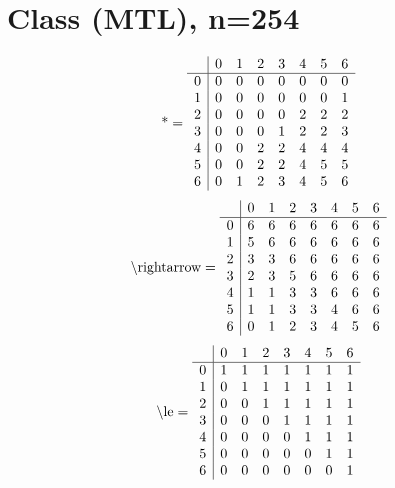 \documentclass[11pt]{article}
\begin{document}
\section{Class (MTL), n=254}
\[\text{*} = 
\begin{array}{r | r r r r r r r}
 & 0 & 1 & 2 & 3 & 4 & 5 & 6 \\ \hline
0 & 0 & 0 & 0 & 0 & 0 & 0 & 0 \\
1 & 0 & 0 & 0 & 0 & 0 & 0 & 1 \\
2 & 0 & 0 & 0 & 0 & 2 & 2 & 2 \\
3 & 0 & 0 & 0 & 1 & 2 & 2 & 3 \\
4 & 0 & 0 & 2 & 2 & 4 & 4 & 4 \\
5 & 0 & 0 & 2 & 2 & 4 & 5 & 5 \\
6 & 0 & 1 & 2 & 3 & 4 & 5 & 6 \\
\end{array}
\]
\[\text{\textbackslash rightarrow} = 
\begin{array}{r | r r r r r r r}
 & 0 & 1 & 2 & 3 & 4 & 5 & 6 \\ \hline
0 & 6 & 6 & 6 & 6 & 6 & 6 & 6 \\
1 & 5 & 6 & 6 & 6 & 6 & 6 & 6 \\
2 & 3 & 3 & 6 & 6 & 6 & 6 & 6 \\
3 & 2 & 3 & 5 & 6 & 6 & 6 & 6 \\
4 & 1 & 1 & 3 & 3 & 6 & 6 & 6 \\
5 & 1 & 1 & 3 & 3 & 4 & 6 & 6 \\
6 & 0 & 1 & 2 & 3 & 4 & 5 & 6 \\
\end{array}
\]
\[\text{\textbackslash le} = 
\begin{array}{r | r r r r r r r}
 & 0 & 1 & 2 & 3 & 4 & 5 & 6 \\ \hline
0 & 1 & 1 & 1 & 1 & 1 & 1 & 1 \\
1 & 0 & 1 & 1 & 1 & 1 & 1 & 1 \\
2 & 0 & 0 & 1 & 1 & 1 & 1 & 1 \\
3 & 0 & 0 & 0 & 1 & 1 & 1 & 1 \\
4 & 0 & 0 & 0 & 0 & 1 & 1 & 1 \\
5 & 0 & 0 & 0 & 0 & 0 & 1 & 1 \\
6 & 0 & 0 & 0 & 0 & 0 & 0 & 1 \\
\end{array}
\]
\end{document}
